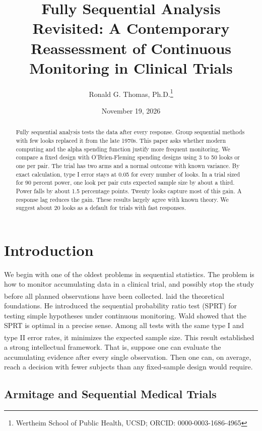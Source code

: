 \documentclass[
  11pt,
]{article}
\title{Fully Sequential Analysis Revisited: A Contemporary Reassessment of Continuous Monitoring in Clinical Trials}
\author{Ronald G. Thomas, Ph.D.\thanks{Wertheim School of Public Health, UCSD; ORCID: 0000-0003-1686-4965}}
\date{November 19, 2026}
\begin{document}
\maketitle
\begin{abstract}
Fully sequential analysis tests the data after every
response. Group sequential methods with few looks
replaced it from the late 1970s. This paper asks
whether modern computing and the alpha spending
function justify more frequent monitoring. We compare a
fixed design with O'Brien-Fleming spending designs
using 3 to 50 looks or one per pair. The trial has two
arms and a normal outcome with known variance. By exact
calculation, type I error stays at 0.05 for every
number of looks. In a trial sized for 90 percent power,
one look per pair cuts expected sample size by about a
third. Power falls by about 1.5 percentage points.
Twenty looks capture most of this gain. A response lag
reduces the gain. These results largely agree with
known theory. We suggest about 20 looks as a default
for trials with fast responses.
\end{abstract}

{
\setcounter{tocdepth}{2}
\tableofcontents
}
\section{Introduction}\label{introduction}

We begin with one of the oldest problems in sequential
statistics. The problem is how to monitor accumulating
data in a clinical trial, and possibly stop the study
before all planned observations have been collected.\textsuperscript{} laid the theoretical foundations.
He introduced the sequential probability ratio test
(SPRT) for testing simple hypotheses under continuous
monitoring. Wald showed that the SPRT is optimal in a
precise sense. Among all tests with the same type I and
type II error rates, it minimizes the expected sample
size\textsuperscript{}. This result established a
strong intellectual framework. That is, suppose one can
evaluate the accumulating evidence after every single
observation. Then one can, on average, reach a decision
with fewer subjects than any fixed-sample design would
require.

\subsection{Armitage and Sequential Medical Trials}\label{armitage-and-sequential-medical-trials}
\end{document}
